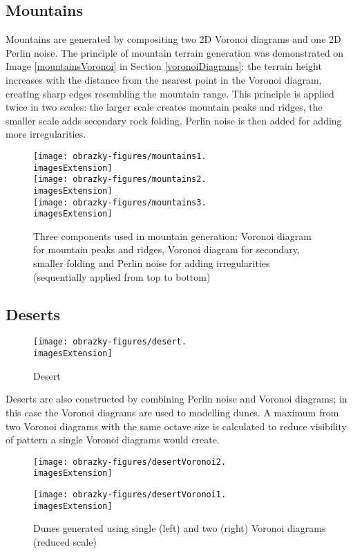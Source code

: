 \subsection{Mountains}
Mountains are generated by compositing two 2D Voronoi diagrams and one 2D Perlin noise. The principle of mountain terrain generation was demonstrated on Image \ref{mountainsVoronoi} in Section \ref{voronoiDiagrams}: the terrain height increases with the distance from the nearest point in the Voronoi diagram, creating sharp edges resembling the mountain range. This principle is applied twice in two scales: the larger scale creates mountain peaks and ridges, the smaller scale adds secondary rock folding. Perlin noise is then added for adding more irregularities.

\begin{figure}[H]
	\centering
	\texttt{[image: obrazky-figures/mountains1.\\imagesExtension]}
	\\ \vspace{1cm}
	\texttt{[image: obrazky-figures/mountains2.\\imagesExtension]}
	\\ \vspace{1cm}
	\texttt{[image: obrazky-figures/mountains3.\\imagesExtension]}
	\caption{Three components used in mountain generation: Voronoi diagram for mountain peaks and ridges, Voronoi diagram for secondary, smaller folding and Perlin noise for adding irregularities (sequentially applied from top to bottom)}
\end{figure}

\subsection{Deserts}
\begin{figure}[H]
	\texttt{[image: obrazky-figures/desert.\\imagesExtension]}
	\caption{Desert}
\end{figure}

Deserts are also constructed by combining Perlin noise and Voronoi diagrams; in this case the Voronoi diagrams are used to modelling dunes. A maximum from two Voronoi diagrams with the same octave size is calculated to reduce visibility of pattern a single Voronoi diagrams would create.

\begin{figure}[H]
	\centering
	\begin{minipage}[t]{0.49\textwidth}
		\texttt{[image: obrazky-figures/desertVoronoi2.\\imagesExtension]}
	\end{minipage}
	\hfill
	\begin{minipage}[t]{0.49\textwidth}
		\texttt{[image: obrazky-figures/desertVoronoi1.\\imagesExtension]}
	\end{minipage}
	\caption{Dunes generated using single (left) and two (right) Voronoi diagrams (reduced scale)}
\end{figure}

